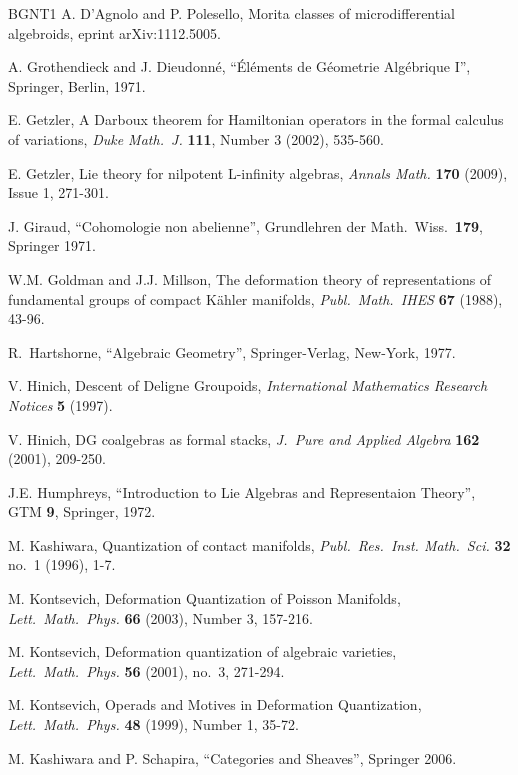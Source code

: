 \documentclass[a4paper, 10pt]{amsart}
\theoremstyle{definition}
\numberwithin{equation}{section}
\begin{document}
\begin{thebibliography}{BGNT1}
 A. D'Agnolo and P. Polesello,
Morita classes of microdifferential algebroids,
eprint arXiv:1112.5005.

 A. Grothendieck and J. Dieudonn\'e, 
	``\'El\'ements de G\'eometrie Alg\'ebrique I'',
	Springer, Berlin, 1971.

 E. Getzler,
	A Darboux theorem for Hamiltonian operators in the formal
	calculus of variations,
	{\em Duke Math.\ J.} {\bf 111}, Number 3 (2002), 535-560. 

 E. Getzler,
Lie theory for nilpotent L-infinity algebras,
{\em Annals Math.} {\bf 170} (2009), Issue 1, 271-301.


 J. Giraud, ``Cohomologie non abelienne'',
	Grundlehren der Math.\ Wiss.\ {\bf 179}, 
	Springer 1971.

 W.M. Goldman and J.J. Millson, 
    The deformation theory of representations of fundamental groups of
    compact K\"{a}hler manifolds, {\em Publ.\ Math.\ IHES} {\bf 67} (1988),
43-96.

 R.\ Hartshorne, ``Algebraic Geometry'',
        Springer-Verlag, New-York, 1977.

V. Hinich, 
Descent of Deligne Groupoids,
{\em International Mathematics Research Notices} {\bf 5} (1997).

 V. Hinich, DG coalgebras as formal stacks,
{\em J.\ Pure and Applied Algebra} {\bf 162} (2001), 209-250.

 J.E. Humphreys, ``Introduction to Lie Algebras
	and Representaion Theory'', 
   	GTM {\bf 9}, Springer, 1972.

 M. Kashiwara, 
 Quantization of contact manifolds, 
{\em Publ.\ Res.\ Inst. Math.\ Sci.} {\bf 32} no.\ 1 (1996), 1-7.

 M. Kontsevich, 
	Deformation Quantization of Poisson Manifolds,
	{\em Lett.\ Math.\ Phys.} {\bf 66} (2003), Number 3,
	 157-216.

 M. Kontsevich,
    Deformation quantization of algebraic varieties,
    {\em Lett.\ Math.\ Phys.} {\bf 56} (2001), no.\ 3, 271-294.

 M. Kontsevich, 
	Operads and Motives in Deformation Quantization,
	{\em Lett.\ Math.\ Phys.} {\bf 48} (1999), Number 1, 35-72.

 M. Kashiwara and P. Schapira,
	``Categories and Sheaves'', Springer 2006.


\end{thebibliography}
\end{document}
